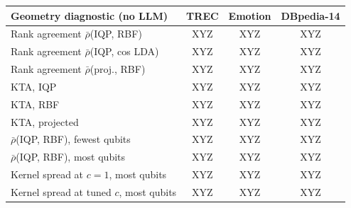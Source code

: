 \begin{tabular}{@{}l ccc@{}}
\toprule
Geometry diagnostic (no LLM) & TREC & Emotion & DBpedia-14 \\
\midrule
Rank agreement $\bar\rho$(IQP, RBF) & XYZ & XYZ & XYZ \\
Rank agreement $\bar\rho$(IQP, cos LDA) & XYZ & XYZ & XYZ \\
Rank agreement $\bar\rho$(proj., RBF) & XYZ & XYZ & XYZ \\
KTA, IQP & XYZ & XYZ & XYZ \\
KTA, RBF & XYZ & XYZ & XYZ \\
KTA, projected & XYZ & XYZ & XYZ \\
\midrule
$\bar\rho$(IQP, RBF), fewest qubits & XYZ & XYZ & XYZ \\
$\bar\rho$(IQP, RBF), most qubits & XYZ & XYZ & XYZ \\
Kernel spread at $c{=}1$, most qubits & XYZ & XYZ & XYZ \\
Kernel spread at tuned $c$, most qubits & XYZ & XYZ & XYZ \\
\bottomrule
\end{tabular}
